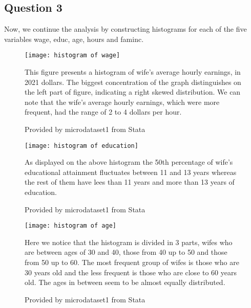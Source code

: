 \documentclass{article}
\begin{document}
	\subsection{Question 3}
	\vspace {0.5\baselineskip}

	Now, we continue the analysis by constructing histograms for each of the five variables wage, educ, age, hours and faminc.

\begin{figure}
	\begin{Center}
	\texttt{[image: histogram of wage]}
	\caption{Provided by microdataset1 from Stata}
	\label{fig:histogram of wage}
	\end{Center}
	\vspace {0.5\baselineskip}
	
	This figure presents a histogram of wife's average hourly earnings, in 2021 dollars. The biggest concentration of the graph distinguishes on the left part of figure, indicating a right skewed distribution. We can note that the wife's average hourly earnings, which were more frequent, had the range of 2 to 4 dollars per hour.
\end{figure}
	\vspace {0.5\baselineskip}

\begin{figure}
	\begin{Center}
	\texttt{[image: histogram of education]}
	\caption{Provided by microdataset1 from Stata}
	\label{fig:histogram of education}
	\end{Center}
	\vspace {0.5\baselineskip}
	
	As displayed on the above histogram the 50th percentage of wife’s educational attainment fluctuates between 11 and 13 years whereas the rest of them have lees than 11 years and more than 13 years of education.
\end{figure}
	\vspace {0.5\baselineskip}

\begin{figure}
	\begin{Center}
	\texttt{[image: histogram of age]}
	\caption{Provided by microdataset1 from Stata}
	\label{fig:histogram of age}
	\end{Center}
	\vspace {0.5\baselineskip}

	Here we notice that the histogram is divided in 3 parts, wifes who are between ages of 30 and 40, those from 40 up to 50 and those from 50 up to 60. The most frequent group of wifes is those who are 30 years old and the less frequent is those who are close to 60 years old. The ages in between seem to be almost equally distributed.
\end{figure}
	\vspace {0.5\baselineskip}
	
\end{document}
